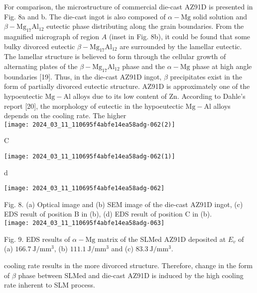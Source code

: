 \documentclass[10pt]{article}
\begin{document}
For comparison, the microstructure of commercial die-cast AZ91D is presented in Fig. 8a and b. The die-cast ingot is also composed of $\alpha-\mathrm{Mg}$ solid solution and $\beta-\mathrm{Mg}_{17} \mathrm{Al}_{12}$ eutectic phase distributing along the grain boundaries. From the magnified micrograph of region $A$ (inset in Fig. 8b), it could be found that some bulky divorced eutectic $\beta-\mathrm{Mg}_{17} \mathrm{Al}_{12}$ are surrounded by the lamellar eutectic. The lamellar structure is believed to form through the cellular growth of alternating plates of the $\beta-\mathrm{Mg}_{17} \mathrm{Al}_{12}$ phase and the $\alpha-\mathrm{Mg}$ phase at high angle boundaries [19]. Thus, in the die-cast AZ91D ingot, $\beta$ precipitates exist in the form of partially divorced eutectic structure. AZ91D is approximately one of the hypoeutectic $\mathrm{Mg}-\mathrm{Al}$ alloys due to its low content of $\mathrm{Zn}$. According to Dahle's report [20], the morphology of eutectic in the hypoeutectic $\mathrm{Mg}-\mathrm{Al}$ alloys depends on the cooling rate. The higher\\
\texttt{[image: 2024\_03\_11\_110695f4abfe14ea58adg-062(2)]}

C

\begin{center}
\texttt{[image: 2024\_03\_11\_110695f4abfe14ea58adg-062(1)]}
\end{center}

d

\begin{center}
\texttt{[image: 2024\_03\_11\_110695f4abfe14ea58adg-062]}
\end{center}

Fig. 8. (a) Optical image and (b) SEM image of the die-cast AZ91D ingot, (c) EDS result of position B in (b), (d) EDS result of position C in (b).\\
\texttt{[image: 2024\_03\_11\_110695f4abfe14ea58adg-063]}

Fig. 9. EDS results of $\alpha-\mathrm{Mg}$ matrix of the SLMed AZ91D deposited at $E_{v}$ of (a) $166.7 \mathrm{~J} / \mathrm{mm}^{3}$, (b) $111.1 \mathrm{~J} / \mathrm{mm}^{3}$ and (c) $83.3 \mathrm{~J} / \mathrm{mm}^{3}$.

cooling rate results in the more divorced structure. Therefore, change in the form of $\beta$ phase between SLMed and die-cast AZ91D is induced by the high cooling rate inherent to SLM process.
\end{document}
